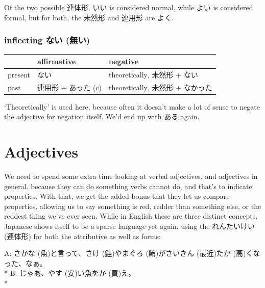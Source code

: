 \documentclass[11pt, b5paper, twoside, openright, onecolumn]{book}
\makeatletter
\newcommand*{\rubystack}[2]{{\relscale{0.5}%
  \begin{tabular}[b]{@{}c@{}}%
    {#1}\\%
   {\textscale{2}{#2}}%
  \end{tabular}}%
}
\DeclareRobustCommand*{\ruby}[2]{%
  \mbox{%
    \setlength{\parskip}{0ex}%
    \BeginAccSupp{method=pdfstringdef,ActualText={#1}}%
      \rubystack{\phantom{#2}}{#1}%
      \llap{%
        \rubystack{#2}{\phantom{#1}}%
      }%
    \EndAccSupp{}%
  }%
}
\renewcommand*{\ruby}[2]{#2 (#1)}%
\newenvironment{exampleblock}{
\setlength{\parindent}{0.6in}
\begin{minipage}[t]{\dimexpr\textwidth-\parindent}}
{\end{minipage}}
\newenvironment{mytabular}[1]{\noindent\hspace{0.4in}
\begin{tabular}[h]{#1}}{\end{tabular}}
\makeatother
\begin{document}
Of the two possible 連体形‚ いい is considered normal‚ while よい is considered formal‚ but for both‚ the 未然形 and 連用形 are よく.


\subsubsection{inflecting ない (無い)}

\smaller
\begin{mytabular}{| l  l  l |}\hline 
\rule{0pt}{2.4ex} & affirmative & negative\\ 
\hline
\rule{0pt}{2.4ex}present & ない & theoretically‚ 未然形 + ない\\ 
\rule{0pt}{2.4ex}past & 連用形 + あった (c) & theoretically‚ 未然形 + なかった\\ 
\hline 
\end{mytabular}
\larger
\vspace{0.5cm}


‘Theoretically’ is used here‚ because often it doesn’t make a lot of sense to negate the adjective for negation itself. We’d end up with ある again.

\section{Adjectives}

We need to spend some extra time looking at verbal adjectives‚ and adjectives in general‚ because they can do something verbs cannot do‚ and that’s to indicate properties. With that‚ we get the added bonus that they let us compare properties‚ allowing us to say something is red‚ redder than something else‚ or the reddest thing we’ve ever seen. While in English these are three distinct concepts‚ Japanese shows itself to be a sparse language yet again‚ using the \ruby{連体形}{れんたいけい} for both the attributive as well as  forms:

\vspace{0.4cm}
\begin{exampleblock}
A: \ruby{魚}{さかな}と言って、\ruby{鮭}{さけ}や\ruby{鮪}{まぐろ}が\ruby{最近}{さいきん}\ruby{高}{たか}くなった、なぁ。 \\* 
B: じゃあ、\ruby{安}{やす}い魚を\ruby{買}{か}え。 \\* 
\end{exampleblock}
\vspace{0.2cm}
\end{document}
